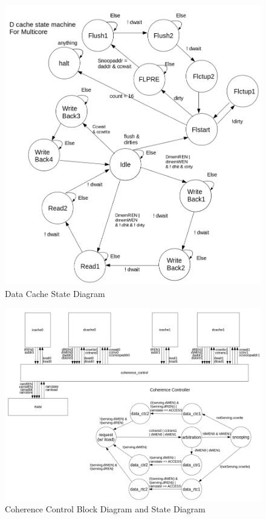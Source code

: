 \documentclass[12pt]{article}
\begin{document}
  \newpage
  \begin{figure}[hp]
    \begin{center}
      \includegraphics[width=\textwidth]{diagrams/dcache_state_machine.png}
    \end{center}

    \caption{Data Cache State Diagram}
		\label{fig:dcache_sd}
  \end{figure}

  \newpage
  \begin{figure}[hp]
    \begin{center}
      \includegraphics[width=\textwidth]{diagrams/diagram_coherence_control.png}
    \end{center}

    \caption{Coherence Control Block Diagram and State Diagram}
		\label{fig:coherence_control}
  \end{figure}
\end{document}
